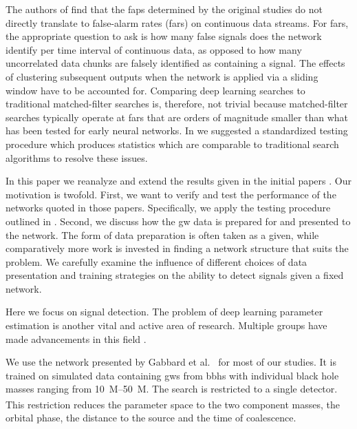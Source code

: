 The authors of \cite{Gebhard:2019ldz} find that the \acrshort{fap}s determined by the original studies do not directly translate to false-alarm rates (\acrshort{far}s) on continuous data streams. For \acrshort{far}s, the appropriate question to ask is how many false signals does the network identify per time interval of continuous data, as opposed to how many uncorrelated data chunks are falsely identified as containing a signal. The effects of clustering subsequent outputs when the network is applied via a sliding window have to be accounted for. Comparing deep learning searches to traditional matched-filter searches is, therefore, not trivial because matched-filter searches typically operate at \acrshort{far}s that are orders of magnitude smaller than what has been tested for early neural networks. In \cite{Schafer:2020kor} we suggested a standardized testing procedure which produces statistics which are comparable to traditional search algorithms to resolve these issues.

In this paper we reanalyze and extend the results given in the initial papers \cite{George:2016hay, Gabbard:2017lja}. Our motivation is twofold. First, we want to verify and test the performance of the networks quoted in those papers. Specifically, we apply the testing procedure outlined in \cite{Schafer:2020kor}. Second, we discuss how the \acrshort{gw} data is prepared for and presented to the network. The form of data preparation is often taken as a given, while comparatively more work is invested in finding a network structure that suits the problem. We carefully examine the influence of different choices of data presentation and training strategies on the ability to detect signals given a fixed network.

Here we focus on signal detection. The problem of deep learning parameter estimation is another vital and active area of research. Multiple groups have made advancements in this field \cite{Chua:2019wwt, Gabbard:2019rde, Green:2020hst, Williams:2021qyt, Schmidt:2020yuu, George:2016hay}.

We use the network presented by Gabbard et al.\ \cite{Gabbard:2017lja} for most of our studies. It is trained on simulated data containing \acrshort{gw}s from \acrshort{bbh}s with individual black hole masses ranging from \SIrange{10}{50}{M_\odot}. The search is restricted to a single detector. This restriction reduces the parameter space to the two component masses, the orbital phase, the distance to the source and the time of coalescence.

